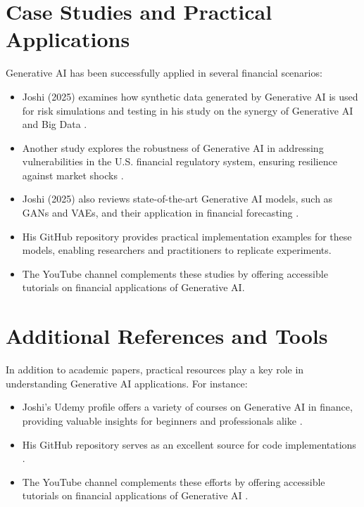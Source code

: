\documentclass[a4paper,headinclude=on,footinclude=on,12pt,oneside]{scrbook}
\begin{document}
\section*{Case Studies and Practical Applications}
Generative AI has been successfully applied in several financial scenarios:
\begin{itemize}
	\item Joshi (2025) examines how synthetic data generated by Generative AI is used for risk simulations and testing in his study on the synergy of Generative AI and Big Data \cite{JoshiIJFMR2025}.
	\item Another study explores the robustness of Generative AI in addressing vulnerabilities in the U.S. financial regulatory system, ensuring resilience against market shocks \cite{JoshiIJIREM2025}.
	\item Joshi (2025) also reviews state-of-the-art Generative AI models, such as GANs and VAEs, and their application in financial forecasting \cite{JoshiCSEIT2025}.
	\item His GitHub repository \cite{JoshiGit2025} provides practical implementation examples for these models, enabling researchers and practitioners to replicate experiments.
	\item The YouTube channel \cite{JoshiYouTube2025} complements these studies by offering accessible tutorials on financial applications of Generative AI.
\end{itemize}

\section*{Additional References and Tools}

In addition to academic papers, practical resources play a key role in understanding Generative AI applications. For instance:
\begin{itemize}
	\item Joshi’s Udemy profile offers a variety of courses on Generative AI in finance, providing valuable insights for beginners and professionals alike \cite{JoshiUdemy2025}.
	\item His GitHub repository serves as an excellent source for code implementations \cite{JoshiGit2025}.
	\item The YouTube channel complements these efforts by offering accessible tutorials on financial applications of Generative AI \cite{JoshiYouTube2025}.
\end{itemize}
\end{document}
